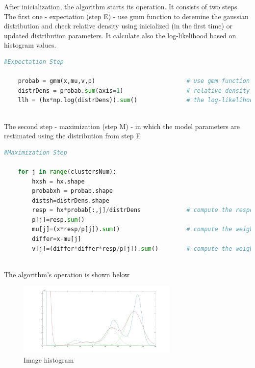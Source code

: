 After inicialization, the algorithm starts its operation. It consists of two steps. The first one - expectation (step E) - use gmm function to deremine the gaussian distribution and check relative density using inicialized (in the first time) or updated distribution parameters. It calculate also the log-likelihood based on histogram values. 

\begin{lstlisting}[language=Python, caption = Segmentation - step E]
#Expectation Step

    probab = gmm(x,mu,v,p)							# use gmm function - get probability
    distrDens = probab.sum(axis=1)					# relative density 
    llh = (hx*np.log(distrDens)).sum()				# the log-likelihood base on histogram data
\end{lstlisting}\\

The second step - maximization (step M) -  in which the model parameters are restimated using the distribution from step E



\begin{lstlisting}[language=Python, caption = Segmentation - step M]
#Maximization Step

    for j in range(clustersNum):
        hxsh = hx.shape
        probabxh = probab.shape
        distsh=distrDens.shape
        resp = hx*probab[:,j]/distrDens				# compute the responsibilities
        p[j]=resp.sum()
        mu[j]=(x*resp/p[j]).sum()					# compute the weighted of expected values
        differ=x-mu[j]
        v[j]=(differ*differ*resp/p[j]).sum()		# compute the weighted varainces	
\end{lstlisting}\\

The algorithm's operation is shown below 

\begin{figure}[H]
	\centering{}\includegraphics[width=0.7\textwidth]{figures/Module_09/m09_13}
	\caption{Image histogram  
	\label{fig:figures/m09_13}}
\end{figure} 


